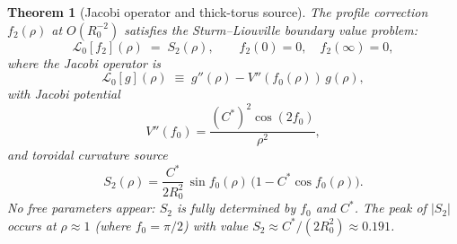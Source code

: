 \documentclass[11pt,a4paper]{article}
\newtheorem{theorem}{Theorem}[section]
\theoremstyle{definition}
\theoremstyle{remark}
\newcommand{\Cstar}{C^*}
\newcommand{\fzero}{f_0}
\newcommand{\ftwo}{f_2}
\newcommand{\Ltwo}{\mathcal{L}_0}
\newcommand{\Stwo}{S_2}
\newcommand{\Rzero}{R_0}
\begin{document}
\begin{theorem}[Jacobi operator and thick-torus source]
\label{P14:thm:jacobi}
The profile correction $\ftwo(\rho)$ at $O(\Rzero^{-2})$ satisfies
the Sturm--Liouville boundary value problem:
\begin{equation}
  \Ltwo[\ftwo](\rho) \;=\; \Stwo(\rho),
  \qquad \ftwo(0) = 0, \quad \ftwo(\infty) = 0,
  \label{P14:eq:bvp}
\end{equation}
where the Jacobi operator is
\begin{equation}
  \Ltwo[g](\rho) \;\equiv\; g''(\rho) - V''(\fzero(\rho))\,g(\rho),
  \label{P14:eq:jacobi_op}
\end{equation}
with Jacobi potential
\begin{equation}
  \boxed{V''(\fzero) = \frac{({C^*})^2\cos(2\fzero)}{\rho^2},}
  \label{P14:eq:jacobi_potential}
\end{equation}
and toroidal curvature source
\begin{equation}
  \boxed{\Stwo(\rho) = \frac{\Cstar}{2\Rzero^2}\,
  \sin\fzero(\rho)\,\bigl(1 - \Cstar\cos\fzero(\rho)\bigr).}
  \label{P14:eq:source}
\end{equation}
No free parameters appear: $\Stwo$ is fully determined by $\fzero$ and
$\Cstar$. The peak of $|\Stwo|$ occurs at $\rho\approx1$ (where $\fzero=\pi/2$)
with value $\Stwo\approx\Cstar/(2\Rzero^2)\approx0.191$.
\end{theorem}
\end{document}
